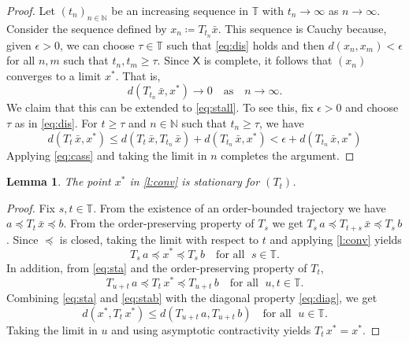 \documentclass[12pt,reqno]{amsart}
\numberwithin{equation}{section}
\newtheorem{lemma}{Lemma}[section]
\theoremstyle{definition}
\newcommand{\1}{\mathbbm{1}}
\newcommand{\NN}{\mathbb{N}}
\newcommand{\TT}{\mathbb T}
\newcommand{\Xsf}{\mathsf{X}}
\begin{document}
\begin{proof}
    Let $(t_n)_{n \in \NN}$ be an increasing sequence in $\TT$ with $t_n \to \infty$ as $n \to \infty$.
    Consider the sequence defined by $x_n \coloneq T_{t_n} \bar x$.  This sequence is
    Cauchy because, given $\epsilon > 0$, we can choose $\tau \in \TT$ such that
    \eqref{eq:dis} holds and then $d(x_n, x_m) < \epsilon$ for all $n, m$ such
    that $t_n, t_m \geq \tau$.  Since $\Xsf$ is complete, it follows that $(x_n)$
    converges to a limit $x^*$.  That is,
    \begin{equation}\label{eq:cass}
         d(T_{t_n} \, \bar x, x^*) \to 0
         \quad \text{as} \quad
         n \to \infty.
    \end{equation}
    We claim that this can be extended to \eqref{eq:stall}.
    To see this, fix $\epsilon > 0$ and choose $\tau$ as in \eqref{eq:dis}. For $t
    \geq \tau$ and $n \in \NN$ such that $t_n \geq \tau$, we have
    \begin{equation*}
        d(T_t \, \bar x, x^*)
        \leq d(T_t \, \bar x, T_{t_n} \, \bar x) + d(T_{t_n} \, \bar x, x^*)
         < \epsilon + d(T_{t_n} \, \bar x, x^*)
    \end{equation*}
    Applying \eqref{eq:cass} and taking the limit in $n$ completes the argument.
\end{proof}

\begin{lemma}\label{l:fpfxs}
    The point $x^*$ in \cref{l:conv} is stationary for $(T_t)$.
\end{lemma}

\begin{proof}
    Fix $s, t \in \TT$. From the existence of an order-bounded trajectory we have $a \preceq
    T_t \, \bar x \preceq b$. From the order-preserving property
    of $T_s$ we get $T_s \, a \preceq T_{t + s} \, \bar x \preceq T_s \, b$.
    Since $\preceq$ is closed, taking the limit with respect to $t$ and applying \cref{l:conv} yields
    \begin{equation}\label{eq:sta}
        T_s \, a \preceq x^* \preceq T_s \, b
        \quad \text{for all } \; s \in \TT.
    \end{equation}
    In addition, from \eqref{eq:sta} and the order-preserving property
    of $T_t$,
    \begin{equation}\label{eq:stab}
        T_{u + t} \, a \preceq T_t \, x^* \preceq T_{u + t} \, b
        \quad \text{for all } \; u, t \in \TT.
    \end{equation}
    Combining \eqref{eq:sta} and \eqref{eq:stab} with the diagonal property
    \eqref{eq:diag}, we get
    \begin{equation}\label{eq:fxss}
        d(x^*, T_t \, x^*) \leq d(T_{u+t} \, a, T_{u+t} \, b)
        \quad \text{for all } \; u \in \TT.
    \end{equation}
    Taking the limit in $u$ and using asymptotic contractivity yields
    $T_t \, x^* = x^*$.
\end{proof}
\end{document}
